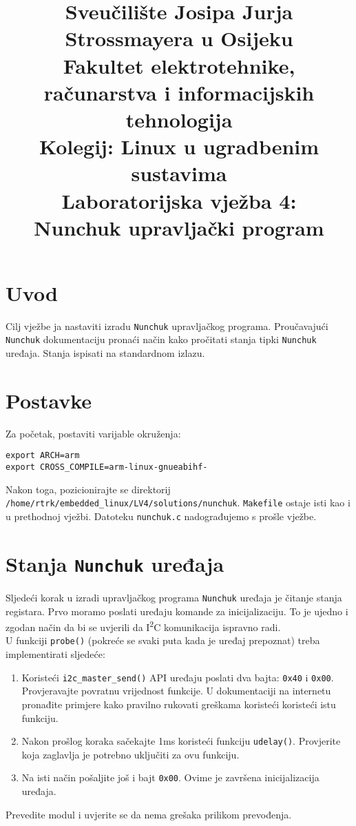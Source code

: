 \documentclass[11pt]{article}
\title{
	\Large Sveučilište Josipa Jurja Strossmayera u Osijeku \\
	Fakultet elektrotehnike, računarstva i informacijskih tehnologija \\
	\vspace{4cm}
	\Large Kolegij: Linux u ugradbenim sustavima \\
	\vspace{4cm}
	\Large \textbf{Laboratorijska vježba 4:\\
	Nunchuk upravljački program}
	}
\date{}
\begin{document}
\maketitle
\thispagestyle{empty}
\newpage

\section{Uvod}
Cilj vježbe ja nastaviti izradu \texttt{Nunchuk} upravljačkog programa.
Proučavajući \texttt{Nunchuk} dokumentaciju pronaći način kako pročitati
stanja tipki \texttt{Nunchuk} uređaja. Stanja ispisati na standardnom izlazu.

\section{Postavke}
Za početak, postaviti varijable okruženja:
\begin{lstlisting}
export ARCH=arm
export CROSS_COMPILE=arm-linux-gnueabihf-
\end{lstlisting}
Nakon toga, pozicionirajte se direktorij
\texttt{/home/rtrk/embedded\_linux/LV4/solutions/nunchuk}. \texttt{Makefile}
ostaje isti kao i u prethodnoj vježbi. Datoteku \texttt{nunchuk.c} nadograđujemo
s prošle vježbe.

\section{Stanja \texttt{Nunchuk} uređaja}
Sljedeći korak u izradi upravljačkog programa \texttt{Nunchuk} uređaja je
čitanje stanja registara. Prvo moramo poslati uređaju komande za inicijalizaciju.
To je ujedno i zgodan način da bi se uvjerili da I\textsuperscript{2}C komunikacija
ispravno radi.\\
\newline
U funkciji \texttt{probe()} (pokreće se svaki puta kada je uređaj prepoznat)
treba implementirati sljedeće:
\begin{enumerate}
	\item Koristeći \texttt{i2c\_master\_send()} API uređaju poslati dva bajta:
		\texttt{0x40} i \texttt{0x00}. Provjeravajte povratnu vrijednost
		funkcije. U dokumentaciji na internetu pronađite primjere kako pravilno
		rukovati greškama koristeći koristeći istu funkciju.
	\item Nakon prošlog koraka sačekajte 1ms koristeći funkciju \texttt{udelay()}.
		Provjerite koja zaglavlja je potrebno uključiti za ovu funkciju.
	\item Na isti način pošaljite još i bajt \texttt{0x00}. Ovime je završena
		inicijalizacija uređaja.
\end{enumerate}
Prevedite modul i uvjerite se da nema grešaka prilikom prevođenja.
\end{document}
